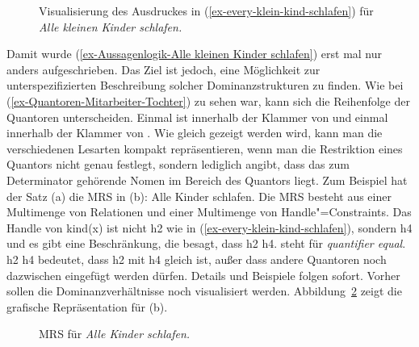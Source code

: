 \begin{figure}
\caption{Visualisierung des Ausdruckes in (\ref{ex-every-klein-kind-schlafen}) für \emph{Alle kleinen Kinder schlafen.}}\label{fig-Alle
  kleinen Kinder schlafen-geskopte-MRS}
\end{figure}
Damit wurde (\ref{ex-Aussagenlogik-Alle kleinen Kinder schlafen}) erst mal nur anders
aufgeschrieben. Das Ziel ist jedoch, eine Möglichkeit zur unterspezifizierten Beschreibung solcher
Dominanzstrukturen zu finden. Wie bei (\ref{ex-Quantoren-Mitarbeiter-Tochter}) zu sehen war, kann
sich die Reihenfolge der Quantoren unterscheiden. Einmal ist  innerhalb der Klammer von 
und einmal  innerhalb der Klammer von . Wie gleich gezeigt werden wird, kann man die
verschiedenen Lesarten kompakt repräsentieren, wenn man die Restriktion eines Quantors nicht genau
festlegt, sondern lediglich angibt, dass das zum Determinator gehörende Nomen im Bereich des
Quantors liegt. Zum Beispiel hat der Satz (a) die MRS in (b):
\eal
\ex Alle Kinder schlafen.
\ex {}
\zl
Die MRS besteht aus einer Multimenge von Relationen und einer Multimenge von Handle"=Constraints.
Das Handle von kind(x) ist nicht h2 wie in (\ref{ex-every-klein-kind-schlafen}), sondern
h4 und es gibt eine Beschränkung, die besagt, dass h2 \qeq h4. \qeq steht für \emph{quantifier
  equal}. h2 \qeq h4 bedeutet, dass h2 mit h4 gleich ist, außer dass andere Quantoren noch
dazwischen eingefügt werden dürfen. Details und Beispiele folgen sofort. Vorher sollen die Dominanzverhältnisse
noch visualisiert werden. Abbildung~\ref{fig-Alle Kinder schlafen-MRS} zeigt die grafische
Repräsentation für (b). 
\begin{figure}
\caption{MRS für \emph{Alle Kinder schlafen.}}\label{fig-Alle Kinder schlafen-MRS}
\end{figure}
